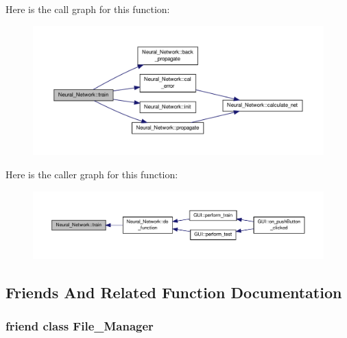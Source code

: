 Here is the call graph for this function\-:\nopagebreak
\begin{figure}[H]
\begin{center}
\leavevmode
\includegraphics[width=350pt]{d1/d7c/a00003_a033f4f60812c0359cc50815e957f11f7_cgraph}
\end{center}
\end{figure}




Here is the caller graph for this function\-:\nopagebreak
\begin{figure}[H]
\begin{center}
\leavevmode
\includegraphics[width=350pt]{d1/d7c/a00003_a033f4f60812c0359cc50815e957f11f7_icgraph}
\end{center}
\end{figure}




\subsection{Friends And Related Function Documentation}
\hypertarget{a00003_a96aa84fcda6b19a74fff9d19c16b07fe}{
\subsubsection[{File\-\_\-\-Manager}]{\setlength{\rightskip}{0pt plus 5cm}friend class {\bf File\-\_\-\-Manager}\hspace{0.3cm}{\ttfamily [friend]}}}\label{d1/d7c/a00003_a96aa84fcda6b19a74fff9d19c16b07fe}


